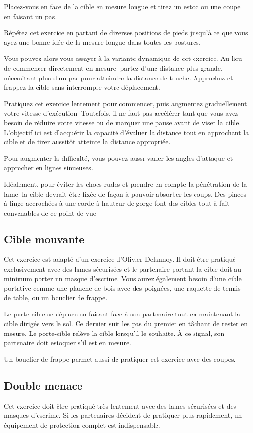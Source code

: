 Placez-vous en face de la cible en mesure longue et tirez un estoc ou une coupe en faisant un pas.

Répétez cet exercice en partant de diverses positions de pieds jusqu'à ce que vous ayez une bonne idée de la mesure longue dans toutes les postures.

Vous pouvez alors vous essayer à la variante dynamique de cet exercice.
Au lieu de commencer directement en mesure, partez d'une distance plus grande, nécessitant plus d'un pas pour atteindre la distance de touche.
Approchez et frappez la cible sans interrompre votre déplacement.

Pratiquez cet exercice lentement pour commencer, puis augmentez graduellement votre vitesse d'exécution.
Toutefois, il ne faut pas accélérer tant que vous avez besoin de réduire votre vitesse ou de marquer une pause avant de viser la cible.
L'objectif ici est d'acquérir la capacité d'évaluer la distance tout en approchant la cible et de tirer aussitôt atteinte la distance appropriée.

Pour augmenter la difficulté, vous pouvez aussi varier les angles d'attaque et approcher en lignes sinueuses.

Idéalement, pour éviter les chocs rudes et prendre en compte la pénétration de la lame, la cible devrait être fixée de façon à pouvoir absorber les coups.
Des pinces à linge accrochées à une corde à hauteur de gorge font des cibles tout à fait convenables de ce point de vue.

\subsection{Cible mouvante}
Cet exercice est adapté d'un exercice d'Olivier Delannoy.
Il doit être pratiqué exclusivement avec des lames sécurisées et le partenaire portant la cible doit au minimum porter un masque d'escrime.
Vous aurez également besoin d'une cible portative comme une planche de bois avec des poignées, une raquette de tennis de table, ou un bouclier de frappe.

Le porte-cible se déplace en faisant face à son partenaire tout en maintenant la cible dirigée vers le sol.
Ce dernier suit les pas du premier en tâchant de rester en mesure.
Le porte-cible relève la cible lorsqu'il le souhaite.
À ce signal, son partenaire doit estoquer s'il est en mesure.

Un bouclier de frappe permet aussi de pratiquer cet exercice avec des coupes.

\subsection{Double menace}
Cet exercice doit être pratiqué très lentement avec des lames sécurisées et des masques d'escrime.
Si les partenaires décident de pratiquer plus rapidement, un équipement de protection complet est indispensable.


